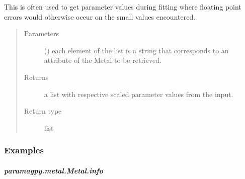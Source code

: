 \documentclass[a4paper,10pt,english,openany,oneside]{sphinxmanual}
\begin{document}
\begin{fulllineitems}
\begin{fulllineitems}
\begin{fulllineitems}
This is often used to get parameter values during fitting where
floating point errors would otherwise occur on the small values
encountered.
\begin{quote}\begin{description}
\item[{Parameters}] \leavevmode
{} () \textendash{} each element of the list is a string that corresponds to
an attribute of the Metal to be retrieved.

\item[{Returns}] \leavevmode
{} \textendash{} a list with respective scaled parameter values from the input.

\item[{Return type}] \leavevmode
list

\end{description}\end{quote}
\subsubsection*{Examples}

%
\begin{sphinxVerbatim}[commandchars=\\\{\}]
  \PYG{p}{[} \PYG{p}{]}\PYG{p}{[}\PYG{p}{]}
\PYG{p}{[}\PYG{p}{]}
\end{sphinxVerbatim}

\end{fulllineitems}



\subparagraph{paramagpy.metal.Metal.info}
\label{\detokenize{reference/generated/paramagpy.metal.Metal.info:paramagpy-metal-metal-info}}\label{\detokenize{reference/generated/paramagpy.metal.Metal.info::doc}}


\end{fulllineitems}
\end{fulllineitems}
\end{document}
